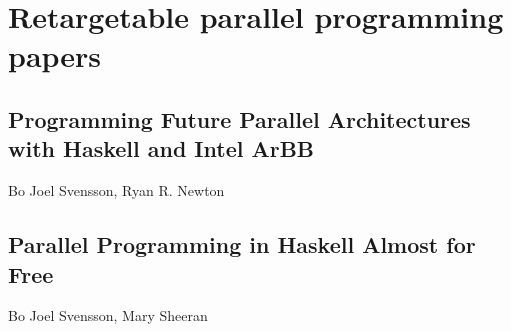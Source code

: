\documentclass[a4paper]{book}
\newcommand{\paperARBB}{Programming Future Parallel Architectures with Haskell and Intel ArBB}
\newcommand{\paperEMBARBB}{Parallel Programming in Haskell Almost for Free}
\begin{document}




% 

\chapter{Retargetable parallel programming papers}
\label{chap:ArBB}
% 
\cleardoublepage 


\section{\paperARBB}
\label{sec:paperARBB}

\begin{center} 
Bo Joel Svensson, Ryan R. Newton
\end{center}




% 
\cleardoublepage 


\section{\paperEMBARBB}
\label{sec:paperEMBARBB}

\begin{center} 
Bo Joel Svensson, Mary Sheeran
\end{center}





\cleardoublepage


\nocite{*}



\makeatletter
\renewenvironment{thebibliography}[1]
     {\chapter*{\bibname}%
      \@mkboth{\MakeUppercase\bibname}{\MakeUppercase\bibname}%
      \list{\@biblabel{\@arabic\c@enumiv}}%
           {\settowidth\labelwidth{\@biblabel{#1}}%
            \leftmargin\labelwidth
            \advance\leftmargin\labelsep
            \@openbib@code
            \usecounter{enumiv}%
            \let\p@enumiv\@empty
            \renewcommand\theenumiv{\@arabic\c@enumiv}}%
      \sloppy
      \clubpenalty4000
      \@clubpenalty \clubpenalty
      \widowpenalty4000%
      \sfcode`\.\@m}
     {\def\@noitemerr
       {\@latex@warning{Empty `thebibliography' environment}}%
       \endlist}
\makeatother



\end{document}
